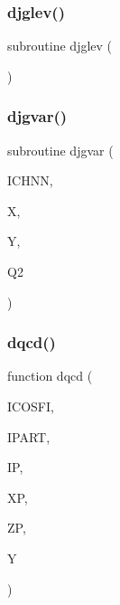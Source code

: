 \subsubsection{\texorpdfstring{djglev()}{djglev()}}
{\footnotesize\ttfamily subroutine djglev (\begin{DoxyParamCaption}{ }\end{DoxyParamCaption})}

\mbox{\label{djangoh__l_8f_a7d143aff9c64b502834443d7dc719784}} 
\subsubsection{\texorpdfstring{djgvar()}{djgvar()}}
{\footnotesize\ttfamily subroutine djgvar (\begin{DoxyParamCaption}\item[{}]{I\+C\+H\+NN,  }\item[{}]{X,  }\item[{}]{Y,  }\item[{}]{Q2 }\end{DoxyParamCaption})}

\mbox{\label{djangoh__l_8f_a53c2f56342fc25a988f9bc43320a8b3e}} 
\subsubsection{\texorpdfstring{dqcd()}{dqcd()}}
{\footnotesize\ttfamily function dqcd (\begin{DoxyParamCaption}\item[{}]{I\+C\+O\+S\+FI,  }\item[{}]{I\+P\+A\+RT,  }\item[{}]{IP,  }\item[{}]{XP,  }\item[{}]{ZP,  }\item[{}]{Y }\end{DoxyParamCaption})}

\mbox{\label{djangoh__l_8f_a0f3016de25315e77ff3ed85e168e78e6}} 
